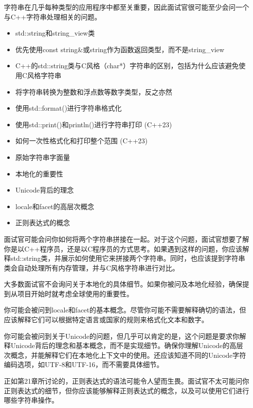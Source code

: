 

字符串在几乎每种类型的应用程序中都至关重要，因此面试官很可能至少会问一个与C++字符串处理相关的问题。


\begin{itemize}
\item
std::string和string\_view类

\item
优先使用const string\&或string作为函数返回类型，而不是string\_view

\item
C++的std::string类与C风格（char*）字符串的区别，包括为什么应该避免使用C风格字符串

\item
将字符串转换为整数和浮点数等数字类型，反之亦然

\item
使用std::format()进行字符串格式化

\item
使用std::print()和println()进行字符串打印 (C++23)

\item
如何一次性格式化和打印整个范围 (C++23)

\item
原始字符串字面量

\item
本地化的重要性

\item
Unicode背后的理念

\item
locale和facet的高层次概念

\item
正则表达式的概念
\end{itemize}


面试官可能会问你如何将两个字符串拼接在一起。对于这个问题，面试官想要了解你是以C++程序员，还是以C程序员的方式思考。如果遇到这样的问题，你应该解释std::string类，并展示如何使用它来拼接两个字符串。同时，也应该提到字符串类会自动处理所有内存管理，并与C风格字符串进行对比。

大多数面试官不会询问关于本地化的具体细节。如果你被问及本地化经验，确保提到从项目开始时就考虑全球使用的重要性。

你可能会被问到locale和facet的基本概念。尽管你可能不需要解释确切的语法，但应该解释它们可以根据特定语言或国家的规则来格式化文本和数字。

你可能会被问到关于Unicode的问题，但几乎可以肯定的是，这个问题是要求你解释Unicode背后的理念和基本概念，而不是实现细节。确保你理解Unicode的高层次概念，并能解释它们在本地化上下文中的使用。还应该知道不同的Unicode字符编码选项，如UTF-8和UTF-16，而不需要具体细节。

正如第21章所讨论的，正则表达式的语法可能令人望而生畏。面试官不太可能问你正则表达式的细节，但你应该能够解释正则表达式的概念，以及可以使用它们进行哪些字符串操作。





